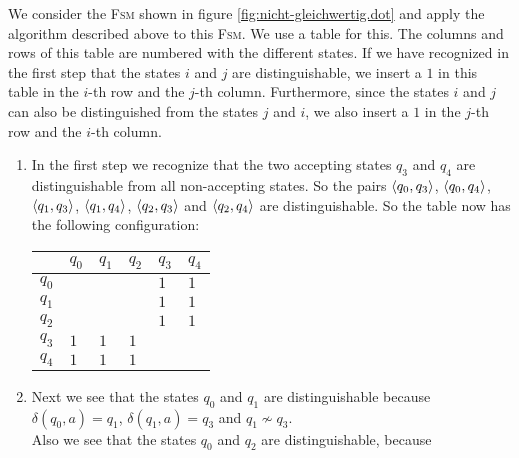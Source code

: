 \exerciseEng
We consider the  \textsc{Fsm} shown in figure \ref{fig:nicht-gleichwertig.dot} and apply the algorithm
described above to this \textsc{Fsm}. 
We use a table for this.  The columns and rows of this table are numbered with the different states.  If we
have recognized in the first step that the states $i$ and $j$ are distinguishable, we insert a $1$ in this
table in the $i$-th row and the $j$-th column. 
Furthermore, since the states $i$ and $j$ can also be distinguished from the states $j$ and $i$, we also insert
a $1$ in the $j$-th row and the $i$-th column. 
\begin{enumerate}
\item In the first step we recognize that the two accepting states $q_3$ and $q_4$ are distinguishable from all non-accepting states.
      So the pairs 
      $\pair(q_0,q_3)$,
      $\pair(q_0,q_4)$,
      $\pair(q_1,q_3)$,
      $\pair(q_1,q_4)$,
      $\pair(q_2,q_3)$ and
      $\pair(q_2,q_4)$
      are distinguishable. So the table now has the following configuration:
      \begin{center}        
      \begin{tabular}[t]{|l||l|l|l|l|l|}
      \hline
            & $q_0$    &    $q_1$ &    $q_2$ &      $q_3$ &      $q_4$  \\
      \hline
      \hline
      $q_0$ &          &          &          & $1$ & $1$  \\
      \hline
      $q_1$ &          &          &          &$1$ &$1$  \\
      \hline
      $q_2$ &          &          &          &$1$ &$1$  \\
      \hline
      $q_3$ &$1$        &$1$         &       $1$ &          &           \\
      \hline
      $q_4$ &$1$ &$1$ &$1$ &          &           \\
      \hline
      \end{tabular}
      \end{center}
\item Next we see that the states $q_0$ and $q_1$ are distinguishable because
      \\[0.2cm]
      \hspace*{1.3cm}
      $\delta(q_0,a) = q_1$, \quad $\delta(q_1,a) = q_3$ \quad and \quad $q_1 \not\sim q_3$.
      \\[0.2cm]
      Also we see that the states $q_0$ and $q_2$ are distinguishable, because
      \\[0.2cm]
      \hspace*{1.3cm}

\end{enumerate}
